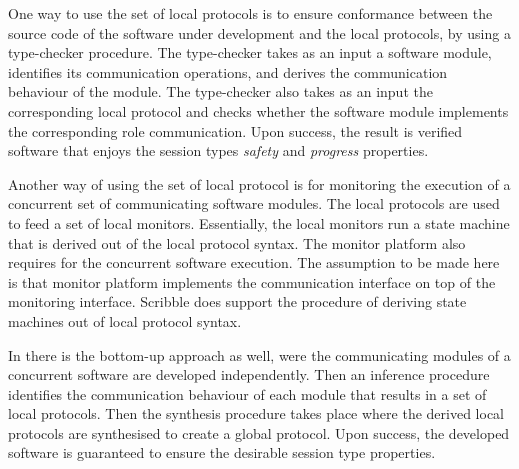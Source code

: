 One way to use the set of local protocols is to ensure
conformance between the source code of the
software under development and the local protocols,
by using a type-checker procedure.
The type-checker takes as an input a software
module, identifies its communication operations,
and derives the communication behaviour of
the module. 
The type-checker also takes as an input the
corresponding local protocol and checks
whether the software module
implements the corresponding role communication.
Upon success, the result is verified software that
enjoys the session types {\em safety} and {\em progress}
properties.

Another way of using the set of local protocol is
for monitoring the execution of a concurrent set
of communicating software modules. The local protocols
are used to feed a set of local monitors. Essentially,
the local monitors run a state machine that is derived
out of the local protocol syntax. The monitor
platform also requires for the concurrent software
execution. The assumption to be made here is that
monitor platform implements the communication interface
on top of the monitoring interface.
Scribble does support the procedure of deriving
state machines out of local protocol syntax.

In  there is the bottom-up approach as well,
were the communicating modules of a concurrent software
are developed independently. Then an inference 
procedure identifies the communication behaviour
of each module that results in a set of local
protocols. Then the synthesis procedure takes place
where the derived local protocols are synthesised
to create a global protocol. Upon success, the
developed software is guaranteed to ensure
the desirable session type properties.


